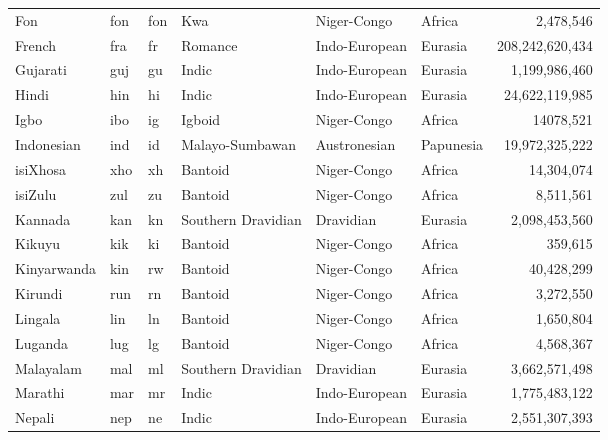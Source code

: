 \documentclass[twoside,11pt]{article}
\begin{document}
\begin{table}[]
{\begin{tabular}{lTTlllr}
Fon                 & fon       & fon         & Kwa                     & Niger-Congo    & Africa    & 2,478,546       \\
French              & fra       & fr          & Romance                 & Indo-European  & Eurasia   & 208,242,620,434  \\
Gujarati            & guj       & gu          & Indic                   & Indo-European  & Eurasia   & 1,199,986,460    \\
Hindi               & hin       & hi          & Indic                   & Indo-European  & Eurasia   & 24,622,119,985   \\
Igbo                & ibo       & ig          & Igboid                  & Niger-Congo    & Africa    & 14078,521      \\
Indonesian          & ind       & id          & Malayo-Sumbawan         & Austronesian   & Papunesia & 19,972,325,222   \\
isiXhosa               & xho       & xh          & Bantoid                 & Niger-Congo    & Africa    & 14,304,074      \\
isiZulu            & zul       & zu          & Bantoid                 & Niger-Congo    & Africa    & 8,511,561       \\
Kannada             & kan       & kn          & Southern Dravidian      & Dravidian      & Eurasia   & 2,098,453,560    \\
Kikuyu              & kik       & ki          & Bantoid                 & Niger-Congo    & Africa    & 359,615        \\
Kinyarwanda         & kin       & rw          & Bantoid                 & Niger-Congo    & Africa    & 40,428,299      \\
Kirundi             & run       & rn          & Bantoid                 & Niger-Congo    & Africa    & 3,272,550       \\
Lingala             & lin       & ln          & Bantoid                 & Niger-Congo    & Africa    & 1,650,804       \\
Luganda             & lug       & lg          & Bantoid                 & Niger-Congo    & Africa    & 4,568,367       \\
Malayalam           & mal       & ml          & Southern Dravidian      & Dravidian      & Eurasia   & 3,662,571,498    \\
Marathi             & mar       & mr          & Indic                   & Indo-European  & Eurasia   & 1,775,483,122    \\
Nepali              & nep       & ne          & Indic                   & Indo-European  & Eurasia   & 2,551,307,393    \\

\end{tabular}}
\end{table}
\end{document}
